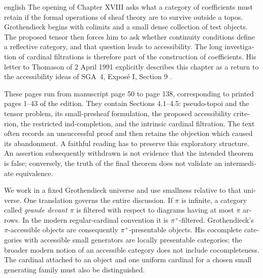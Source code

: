 \begin{otherlanguage}{english}
\begin{otherlanguage*}{english}
\nocite{Grothendieck1990XVIII}
The opening of Chapter XVIII asks what a category of coefficients must retain if the formal operations of sheaf theory are to survive outside a topos. Grothendieck begins with colimits and a small dense collection of test objects. The proposed tensor then forces him to ask whether continuity conditions define a reflective category, and that question leads to accessibility. The long investigation of cardinal filtrations is therefore part of the construction of coefficients. His letter to Thomason of 2 April 1991 explicitly describes this chapter as a return to the accessibility ideas of SGA~4, Expos\'e I, Section 9 \citep{Grothendieck1991Letter,SGA4I1972}.

These pages run from manuscript page 50 to page 138, corresponding to printed pages 1--43 of the edition. They contain Sections 4.1--4.5: pseudo-topoi and the tensor problem, its small-presheaf formulation, the proposed accessibility criterion, the restricted ind-completion, and the intrinsic cardinal filtration. The text often records an unsuccessful proof and then retains the objection which caused its abandonment. A faithful reading has to preserve this exploratory structure. An assertion subsequently withdrawn is not evidence that the intended theorem is false; conversely, the truth of the final theorem does not validate an intermediate equivalence.

We work in a fixed Grothendieck universe and use smallness relative to that universe. One translation governs the entire discussion. If $\pi$ is infinite, a category called \emph{grande devant $\pi$} is filtered with respect to diagrams having at most $\pi$ arrows. In the modern regular-cardinal convention it is $\pi^+$-filtered. Grothendieck's $\pi$-accessible objects are consequently $\pi^+$-presentable objects. His cocomplete categories with accessible small generators are locally presentable categories; the broader modern notion of an accessible category does not include cocompleteness. The cardinal attached to an object and one uniform cardinal for a chosen small generating family must also be distinguished.


\end{otherlanguage*}
\end{otherlanguage}

